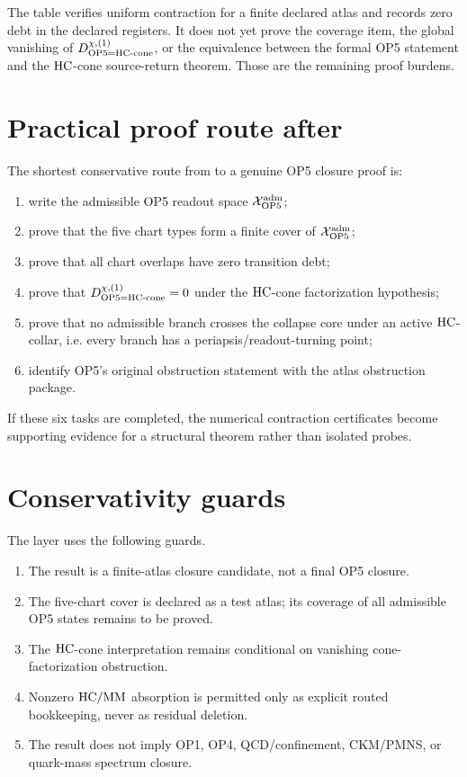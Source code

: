 \begin{remark}
The table verifies uniform contraction for a finite declared atlas and records zero debt in the declared registers. It does not yet prove the coverage item, the global vanishing of \(D_{\mathrm{OP}5=\mathrm{HC}\text{-}\mathrm{cone}}^{\chi,(1)}\), or the equivalence between the formal OP5 statement and the \(\mathrm{HC}\)-cone source-return theorem. Those are the remaining proof burdens.
\end{remark}

\section{Practical proof route after}

The shortest conservative route from to a genuine OP5 closure proof is:
\begin{enumerate}
 \item write the admissible OP5 readout space \(\mathcal X_{\mathrm{OP}5}^{\mathrm{adm}}\);
 \item prove that the five chart types form a finite cover of \(\mathcal X_{\mathrm{OP}5}^{\mathrm{adm}}\);
 \item prove that all chart overlaps have zero transition debt;
 \item prove that \(D_{\mathrm{OP}5=\mathrm{HC}\text{-}\mathrm{cone}}^{\chi,(1)}=0\) under the \(\mathrm{HC}\)-cone factorization hypothesis;
 \item prove that no admissible branch crosses the collapse core under an active \(\mathrm{HC}\)-collar, i.e. every branch has a periapsis/readout-turning point;
 \item identify OP5's original obstruction statement with the atlas obstruction package.
\end{enumerate}
If these six tasks are completed, the numerical contraction certificates become supporting evidence for a structural theorem rather than isolated probes.

\section{Conservativity guards}

The layer uses the following guards.
\begin{enumerate}
 \item The result is a finite-atlas closure candidate, not a final OP5 closure.
 \item The five-chart cover is declared as a test atlas; its coverage of all admissible OP5 states remains to be proved.
 \item The \(\mathrm{HC}\)-cone interpretation remains conditional on vanishing cone-factorization obstruction.
 \item Nonzero \(\mathrm{HC}/\mathrm{MM}\) absorption is permitted only as explicit routed bookkeeping, never as residual deletion.
 \item The result does not imply OP1, OP4, QCD/confinement, CKM/PMNS, or quark-mass spectrum closure.
\end{enumerate}

